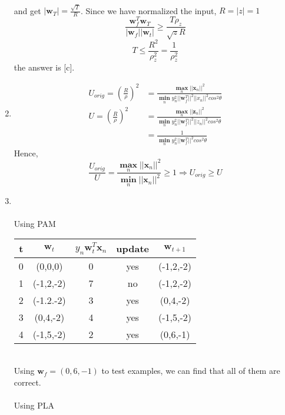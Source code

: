 \documentclass{article}
\begin{document}
\begin{enumerate}
\begin{align*}
    \end{align*}
    and get $|\textbf{w}_T| = \frac{\sqrt{T}}{R}$. Since we have normalized the input, $R = |z| = 1$
    \[\frac{\textbf{w}^T_f\textbf{w}_T}{|\textbf{w}_f||\textbf{w}_t|}\geq \frac{T\rho_z}{\sqrt{z}R}\]
    \[T\leq \frac{R^2}{\rho_z^2} = \frac{1}{\rho_z^2}\]
    the answer is [c].\\
    \item \text{[b]}%
    \begin{align*}
        U_{orig} = \left(\frac{R}{\rho}\right)^2
        & = \frac{\mathop{\boldsymbol{max}}\limits_n||\textbf{x}_n||^2}{\mathop{\boldsymbol{min}}\limits_n y_n^2||\textbf{w}_f^T||^2 ||x_n||^2 cos^2\theta}\\
        U = \left(\frac{R}{\rho}\right)^2 
        & = \frac{\mathop{\boldsymbol{max}}\limits_n||\textbf{z}_n||^2}{\mathop{\boldsymbol{min}}\limits_n y_n^2||\textbf{w}_f^T||^2 ||z_n||^2 cos^2\theta}\\
        & = \frac{1}{\mathop{\boldsymbol{min}}\limits_n y_n^2||\textbf{w}_f^T||^2 cos^2\theta}
    \end{align*}
    Hence,\[\frac{U_{orig}}{U} = \frac{\mathop{\boldsymbol{max}}\limits_n||\textbf{x}_n||^2}{\mathop{\boldsymbol{min}}\limits_n||\textbf{x}_n||^2}\geq 1 \Rightarrow U_{orig}\geq U\]
    \item \text{[c]}\\%
    \\Using PAM\\
    \begin{tabular}{|c c c c c|} 
        \hline
        t & $\textbf{w}_t$ & $y_n\textbf{w}_t^T\textbf{x}_n$ & update & $\textbf{w}_{t+1}$ \\ [0.5ex] 
        \hline
        0 & (0,0,0) & 0 & yes & (-1,2,-2) \\ 
        \hline
        1 & (-1,2,-2) & 7 & no & (-1,2,-2) \\
        \hline
        2 & (-1.2.-2) & 3 & yes & (0,4,-2) \\
        \hline
        3 & (0,4,-2) & 4 & yes & (-1,5,-2) \\
        \hline
        4 & (-1,5,-2) & 2 & yes & (0,6,-1) \\
        \hline
    \end{tabular}\\
    Using $\textbf{w}_f = (0,6,-1)$ to test examples, we can find that all of them are correct.\\\\
    Using PLA\\

\end{enumerate}
\end{document}
